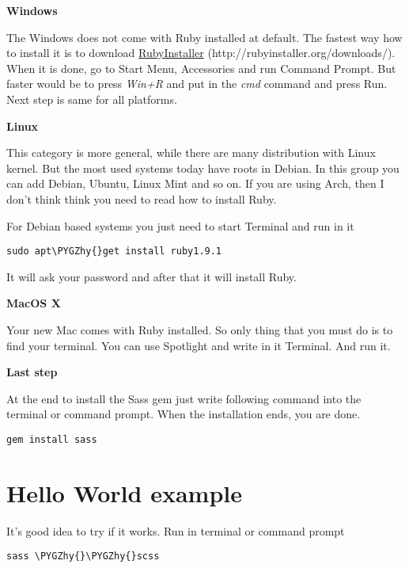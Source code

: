 \documentclass[a4paper,12pt,oneside]{sphinxmanual}
\def\PYGZhy{\char`\-}
\begin{document}
\textbf{Windows}

The Windows does not come with  Ruby installed at default. The fastest way how to install it is to download \href{http://rubyinstaller.org/downloads/}{RubyInstaller} (http://rubyinstaller.org/downloads/).
When it is done, go to Start Menu, Accessories and run Command Prompt. But faster would be to press \emph{Win+R} and put in the \emph{cmd} command and press Run. Next step is same for all platforms.

\textbf{Linux}

This category is more general, while there are many distribution with Linux kernel. But the most used systems today have roots in Debian. In this group you can add Debian, Ubuntu, Linux Mint and so on. If you are using Arch, then I don't think think you need to read how to install Ruby.

For Debian based systems you just need to start Terminal and run in it

\begin{Verbatim}[commandchars=\\\{\}]
sudo apt\PYGZhy{}get install ruby1.9.1
\end{Verbatim}

It will ask your password and after that it will install Ruby.

\textbf{MacOS X}

Your new Mac comes with Ruby installed. So only thing that you must do is to find your terminal. You can use Spotlight and write in it Terminal. And run it.

\textbf{Last step}

At the end to install the Sass gem just write following command into the terminal or command prompt. When the installation ends, you are done.

\begin{Verbatim}[commandchars=\\\{\}]
gem install sass
\end{Verbatim}


\section{Hello World example}
\label{src/first_steps_to_the_sass:hello-world-example}
It's good idea to try if it works. Run in terminal or command prompt

\begin{Verbatim}[commandchars=\\\{\}]
sass \PYGZhy{}\PYGZhy{}scss
\end{Verbatim}
\end{document}
